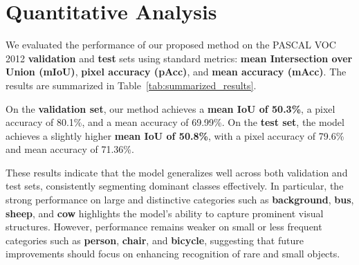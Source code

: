 \section{Quantitative Analysis}
\label{sec:quantitative_analysis}

We evaluated the performance of our proposed method on the PASCAL VOC 2012 \textbf{validation} and \textbf{test} sets using standard metrics: \textbf{mean Intersection over Union (mIoU)}, \textbf{pixel accuracy (pAcc)}, and \textbf{mean accuracy (mAcc)}. The results are summarized in Table~\ref{tab:summarized_results}. 

On the \textbf{validation set}, our method achieves a \textbf{mean IoU of 50.3\%}, a pixel accuracy of 80.1\%, and a mean accuracy of 69.99\%.  
On the \textbf{test set}, the model achieves a slightly higher \textbf{mean IoU of 50.8\%}, with a pixel accuracy of 79.6\% and mean accuracy of 71.36\%.  

These results indicate that the model generalizes well across both validation and test sets, consistently segmenting dominant classes effectively. In particular, the strong performance on large and distinctive categories such as \textbf{background}, \textbf{bus}, \textbf{sheep}, and \textbf{cow} highlights the model’s ability to capture prominent visual structures. However, performance remains weaker on small or less frequent categories such as \textbf{person}, \textbf{chair}, and \textbf{bicycle}, suggesting that future improvements should focus on enhancing recognition of rare and small objects.




